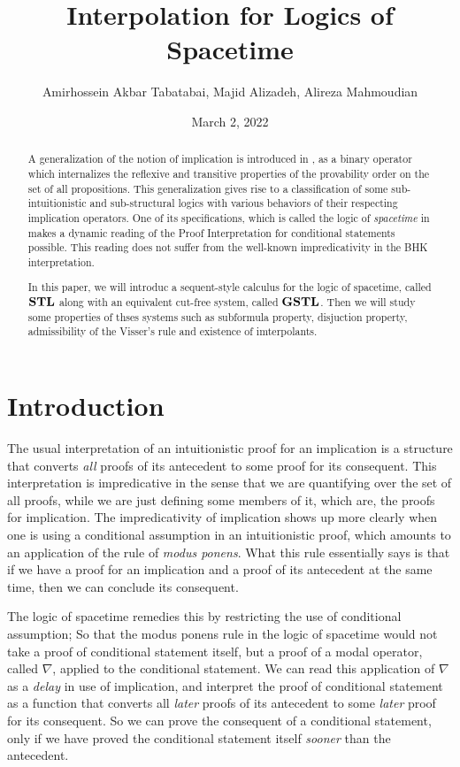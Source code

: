 \documentclass[12pt,a4paper]{article}
\begin{document}
    
\title{Interpolation for Logics of Spacetime}
\author[]{Amirhossein Akbar Tabatabai, Majid Alizadeh, Alireza Mahmoudian}
\affil[]{ }
\date{March 2, 2022}
\maketitle

\begin{abstract}
	A generalization of the notion of implication is introduced in \cite{amir}, as a binary operator which internalizes the reflexive and transitive properties of the provability order on the set of all propositions. This generalization gives rise to a classification of some sub-intuitionistic and sub-structural logics with various behaviors of their respecting implication operators. One of its specifications, which is called the logic of \emph{spacetime} in \cite{amir} makes a dynamic reading of the Proof Interpretation for conditional statements possible. This reading does not suffer from the well-known impredicativity in the BHK interpretation.

	In this paper, we will introduc a sequent-style calculus for the logic of spacetime, called $\mathbf{STL}$ along with an equivalent cut-free system, called $\mathbf{GSTL}$. Then we will study some properties of thses systems such as subformula property, disjuction property, admissibility of the Visser's rule and existence of imterpolants.
\end{abstract}

\section{Introduction}
The usual interpretation of an intuitionistic proof for an implication is a structure that converts \emph{all} proofs of its antecedent to some proof for its consequent. This interpretation is impredicative in the sense that we are quantifying over the set of all proofs, while we are just defining some members of it, which are, the proofs for implication. The impredicativity of implication shows up more clearly when one is using a conditional assumption in an intuitionistic proof, which amounts to an application of the rule of \emph{modus ponens}. What this rule essentially says is that if we have a proof for an implication and a proof of its antecedent at the same time, then we can conclude its consequent.

The logic of spacetime remedies this by restricting the use of conditional assumption; So that the modus ponens rule in the logic of spacetime would not take a proof of conditional statement itself, but a proof of a modal operator, called $\nabla$, applied to the conditional statement. We can read this application of $\nabla$ as a \emph{delay} in use of implication, and interpret the proof of conditional statement as a function that converts all \emph{later} proofs of its antecedent to some \emph{later} proof for its consequent. So we can prove the consequent of a conditional statement, only if we have proved the conditional statement itself \emph{sooner} than the antecedent.\\
\end{document}
